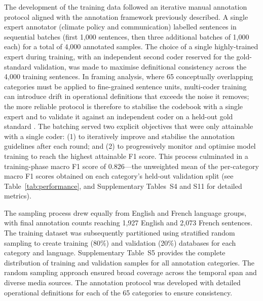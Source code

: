 \documentclass[12pt]{article}
\renewcommand\_{\texttt{\detokenize{_}\allowbreak}}
\begin{document}
The development of the training data followed an iterative manual annotation protocol aligned with the annotation framework previously described. A single expert annotator (climate policy and communication) labelled sentences in sequential batches (first 1,000 sentences, then three additional batches of 1,000 each) for a total of 4,000 annotated samples.  The choice of a single highly-trained expert during training, with an independent second coder reserved for the gold-standard validation, was made to maximise definitional consistency across the 4{,}000 training sentences. In framing analysis, where 65 conceptually overlapping categories must be applied to fine-grained sentence units, multi-coder training can introduce drift in operational definitions that exceeds the noise it removes; the more reliable protocol is therefore to stabilise the codebook with a single expert and to validate it against an independent coder on a held-out gold standard \autocite{krippendorff_content_2019}. The batching served two explicit objectives that were only attainable with a single coder: (1) to iteratively improve and stabilise the annotation guidelines after each round; and (2) to progressively monitor and optimise model training to reach the highest attainable F1 score. This process culminated in a training-phase macro F1 score of 0.826---the unweighted mean of the per-category macro F1 scores obtained on each category's held-out validation split (see Table~\ref{tab:performance}, and Supplementary Tables~S4 and S11 for detailed metrics).

The sampling process drew equally from English and French language groups, with final annotation counts reaching 1,927 English and 2,073 French sentences. The training dataset was subsequently partitioned using stratified random sampling to create training (80\%) and validation (20\%) databases for each category and language. Supplementary Table~S5 provides the complete distribution of training and validation samples for all annotation categories. The random sampling approach ensured broad coverage across the temporal span and diverse media sources. The annotation protocol was developed with detailed operational definitions for each of the 65 categories to ensure consistency.
\end{document}
